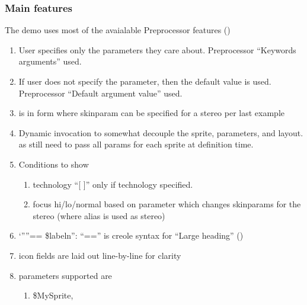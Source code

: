 \documentclass[letterpaper,10pt,english]{sphinxmanual}
\begin{document}
\subsubsection{Main features}
\label{\detokenize{Stdlib/StandardisingStdLib2:main-features}}
The demo uses most of the avaialable Preprocessor features ()
\begin{enumerate}
%
\item {} 
User specifies only the parameters they care about. Preprocessor “Keywords arguments” used.

\item {} 
If user does not specify the parameter, then the default value is used. Preprocessor “Default argument value” used.

\item {} 
 is in form  where skinparam can be specified for a stereo per  last example

\item {} 
Dynamic invocation to somewhat decouple the sprite, parameters, and layout.  as still need to pass all params for each sprite at definition time.

\item {} 
 Conditions to show
\begin{enumerate}
%
\item {} 
technology “{[} {]}” only if technology specified.

\item {} 
focus hi/lo/normal based on parameter which changes skinparams for the stereo (where alias is used as stereo)

\end{enumerate}

\item {} 
‘””== \$labeln”: “==” is creole syntax for “Large heading” ()

\item {} 
icon fields are laid out line-by-line for clarity

\item {} 
parameters supported are
\begin{enumerate}
%
\item {} 
\$MySprite,


\end{enumerate}
\end{enumerate}
\end{document}
